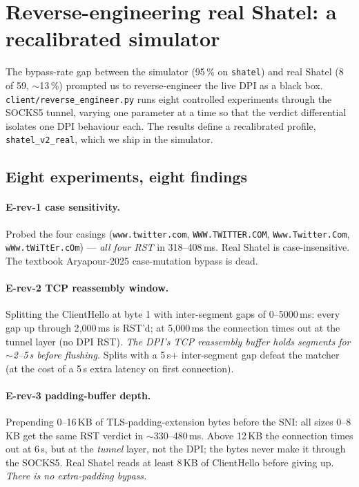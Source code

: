 \documentclass[letterpaper,twocolumn,10pt]{article}
\begin{document}
\section{Reverse-engineering real Shatel: a recalibrated simulator}
\label{sec:reverse}

The bypass-rate gap between the simulator (95\,\% on \texttt{shatel})
and real Shatel (8 of 59, $\sim$13\,\%) prompted us to reverse-engineer
the live DPI as a black box. \texttt{client/reverse\_engineer.py} runs
eight controlled experiments through the SOCKS5 tunnel, varying one
parameter at a time so that the verdict differential isolates one
DPI behaviour each. The results define a recalibrated profile,
\texttt{shatel\_v2\_real}, which we ship in the simulator.

\subsection{Eight experiments, eight findings}

\paragraph{E-rev-1 case sensitivity.}
Probed the four casings (\texttt{www.twitter.com},
\texttt{WWW.TWITTER.COM}, \texttt{Www.Twitter.Com},
\texttt{wWw.tWiTtEr.cOm}) — \emph{all four RST} in 318--408\,ms.
Real Shatel is case-insensitive. The textbook Aryapour-2025
case-mutation bypass is dead.

\paragraph{E-rev-2 TCP reassembly window.}
Splitting the ClientHello at byte 1 with inter-segment gaps of
0--5000\,ms: every gap up through 2{,}000\,ms is RST'd; at 5{,}000\,ms
the connection times out at the tunnel layer (no DPI RST). \emph{The
DPI's TCP reassembly buffer holds segments for $\sim$2--5\,s
before flushing.} Splits with a 5\,s+ inter-segment gap defeat the
matcher (at the cost of a 5\,s extra latency on first connection).

\paragraph{E-rev-3 padding-buffer depth.}
Prepending 0--16\,KB of TLS-padding-extension bytes before the SNI:
all sizes 0--8\,KB get the same RST verdict in $\sim$330--480\,ms.
Above 12\,KB the connection times out at 6\,s, but at the
\emph{tunnel} layer, not the DPI; the bytes never make it through
the SOCKS5. Real Shatel reads at least 8\,KB of ClientHello before
giving up. \emph{There is no extra-padding bypass.}
\end{document}
